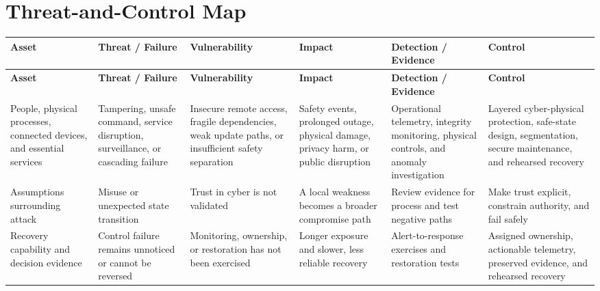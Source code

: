 \documentclass[11pt,letterpaper]{article}
\begin{document}
\section*{Threat-and-Control Map}
\begingroup\scriptsize\setlength{\tabcolsep}{2pt}
\begin{longtable}{>{\raggedright\arraybackslash}p{}>{\raggedright\arraybackslash}p{}>{\raggedright\arraybackslash}p{}>{\raggedright\arraybackslash}p{}>{\raggedright\arraybackslash}p{}>{\raggedright\arraybackslash}p{}}
\toprule\rowcolor{Navy}\color{white}\textbf{Asset} & \color{white}\textbf{Threat / Failure} & \color{white}\textbf{Vulnerability} & \color{white}\textbf{Impact} & \color{white}\textbf{Detection / Evidence} & \color{white}\textbf{Control}\\\midrule
\endfirsthead
\toprule\rowcolor{Navy}\color{white}\textbf{Asset} & \color{white}\textbf{Threat / Failure} & \color{white}\textbf{Vulnerability} & \color{white}\textbf{Impact} & \color{white}\textbf{Detection / Evidence} & \color{white}\textbf{Control}\\\midrule
\endhead
People, physical processes, connected devices, and essential services & Tampering, unsafe command, service disruption, surveillance, or cascading failure & Insecure remote access, fragile dependencies, weak update paths, or insufficient safety separation & Safety events, prolonged outage, physical damage, privacy harm, or public disruption & Operational telemetry, integrity monitoring, physical controls, and anomaly investigation & Layered cyber-physical protection, safe-state design, segmentation, secure maintenance, and rehearsed recovery\\\midrule
Assumptions surrounding attack & Misuse or unexpected state transition & Trust in cyber is not validated & A local weakness becomes a broader compromise path & Review evidence for process and test negative paths & Make trust explicit, constrain authority, and fail safely\\\midrule
Recovery capability and decision evidence & Control failure remains unnoticed or cannot be reversed & Monitoring, ownership, or restoration has not been exercised & Longer exposure and slower, less reliable recovery & Alert-to-response exercises and restoration tests & Assigned ownership, actionable telemetry, preserved evidence, and rehearsed recovery\\\midrule
\bottomrule
\end{longtable}
\endgroup
\end{document}
